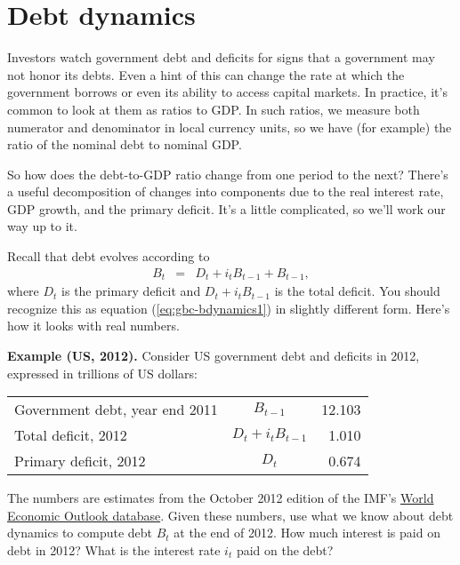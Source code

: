 %
\section{Debt dynamics}

Investors watch government debt and deficits
for signs that a government may not honor its debts.
Even a hint of this can change the rate at which the government
borrows or even its ability to access capital markets.
In practice, it's common to look at them as ratios to GDP.
In such ratios, we measure both numerator and denominator in local currency units,
so we have (for example) the ratio of the nominal debt to nominal GDP.

So how does the debt-to-GDP ratio 
 change from one period to the next?
There's a useful decomposition of changes
into components due to the real interest rate, GDP growth, and the
primary deficit.
It's a little complicated, so we'll work our way up to it.

Recall that debt evolves according to
\begin{eqnarray}
    B_{t} &=& D_t + i_t B_{t-1} + B_{t-1}  ,
    \label{eq:gbc-bdynamics1a}
\end{eqnarray}
where $D_t$ is the primary deficit
and $D_t + i_t B_{t-1}$ is the total deficit.
You should recognize this as equation (\ref{eq:gbc-bdynamics1})
in slightly different form.
Here's how it looks with real numbers.

{\bf Example (US, 2012).}
Consider US government debt and deficits in 2012,
expressed in trillions of US dollars:

\begin{center}
\begin{tabular}{lcr}
\toprule
%
Government debt, year end 2011  &  $B_{t-1}$    & 12.103 \\
Total deficit, 2012             &  $ D_t + i_t B_{t-1}$ & 1.010 \\
Primary deficit, 2012           &  $D_t$        &  0.674 \\
\bottomrule
\end{tabular}
\end{center}

The numbers are estimates from the October 2012 edition of the IMF's
\href{http://www.imf.org/external/ns/cs.aspx?id=28}{World Economic Outlook database}.
%
Given these numbers,
use what we know about debt dynamics to compute debt $B_t$ at the end of 2012.
How much interest is paid on debt in 2012?
What is the interest rate $i_t$ paid on the debt?

